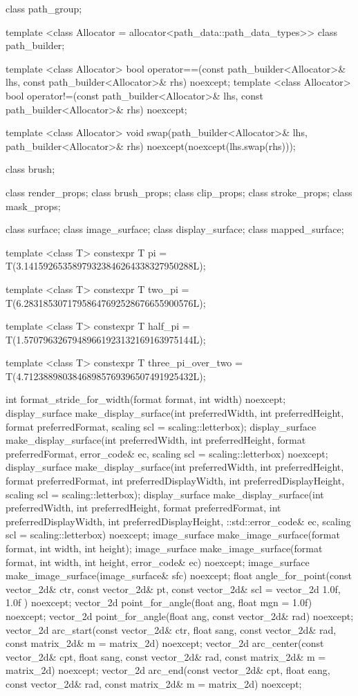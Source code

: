 \begin{codeblock}
{{{{  class path_group;

  template <class Allocator = allocator<path_data::path_data_types>>
  class path_builder;

  template <class Allocator>
  bool operator==(const path_builder<Allocator>& lhs, 
    const path_builder<Allocator>& rhs) noexcept;
  template <class Allocator>
  bool operator!=(const path_builder<Allocator>& lhs, 
    const path_builder<Allocator>& rhs) noexcept;
  
  template <class Allocator>
  void swap(path_builder<Allocator>& lhs, path_builder<Allocator>& rhs)
    noexcept(noexcept(lhs.swap(rhs)));
  
  class brush;

  class render_props;
  class brush_props;
  class clip_props;
  class stroke_props;
  class mask_props;
    
  class surface;
  class image_surface;
  class display_surface;
  class mapped_surface;
  
  template <class T>
  constexpr T pi = T(3.14159265358979323846264338327950288L);
  
  template <class T>
  constexpr T two_pi = T(6.28318530717958647692528676655900576L);
  
  template <class T>
  constexpr T half_pi = T(1.57079632679489661923132169163975144L);
  
  template <class T>
  constexpr T three_pi_over_two = T(4.71238898038468985769396507491925432L);
  
  int format_stride_for_width(format format, int width) noexcept;
  display_surface make_display_surface(int preferredWidth,
    int preferredHeight, format preferredFormat,
    scaling scl = scaling::letterbox);
  display_surface make_display_surface(int preferredWidth,
    int preferredHeight, format preferredFormat, error_code& ec,
    scaling scl = scaling::letterbox) noexcept;
  display_surface make_display_surface(int preferredWidth,
    int preferredHeight, format preferredFormat, int preferredDisplayWidth, 
    int preferredDisplayHeight, scaling scl = scaling::letterbox);
  display_surface make_display_surface(int preferredWidth,
    int preferredHeight, format preferredFormat, int preferredDisplayWidth, 
    int preferredDisplayHeight, ::std::error_code& ec,
    scaling scl = scaling::letterbox) noexcept;
  image_surface make_image_surface(format format, int width, int height);
  image_surface make_image_surface(format format, int width, int height, 
    error_code& ec) noexcept;
  image_surface make_image_surface(image_surface& sfc) noexcept;
  float angle_for_point(const vector_2d& ctr, const vector_2d& pt,
    const vector_2d& scl = vector_2d{ 1.0f, 1.0f }) noexcept;
  vector_2d point_for_angle(float ang, float mgn = 1.0f) noexcept;
  vector_2d point_for_angle(float ang, const vector_2d& rad) noexcept;
  vector_2d arc_start(const vector_2d& ctr, float sang, const vector_2d& rad, 
    const matrix_2d& m = matrix_2d{}) noexcept;
  vector_2d arc_center(const vector_2d& cpt, float sang, const vector_2d& rad, 
    const matrix_2d& m = matrix_2d{}) noexcept;
  vector_2d arc_end(const vector_2d& cpt, float eang, const vector_2d& rad, 
    const matrix_2d& m = matrix_2d{}) noexcept;
} } } }

\end{codeblock}
%
